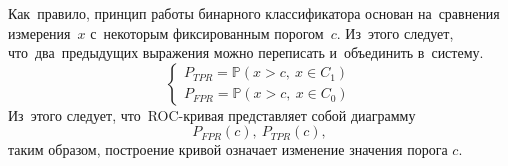 \documentclass[]{scrreprt}
\begin{document}
Как~правило, принцип работы бинарного классификатора основан на~сравнения измерения~$x$ с~некоторым фиксированным порогом~$c$. Из~этого следует, что~два~предыдущих выражения можно переписать и~объединить в~систему.
\begin{equation}\label{eq:TRP+FPR-probability}
\begin{cases}
P_{TPR} = \mathbb{P}(x>c,\ x \in C_{1})\\
P_{FPR} = \mathbb{P}(x>c,\ x \in C_{0})
\end{cases}
\end{equation}
Из~этого следует, что~ROC-кривая представляет собой диаграмму
\begin{equation}\label{eq:ROC-contour}
P_{FPR}(c),\ P_{TPR}(c),
\end{equation}
таким образом, построение кривой означает изменение значения порога $c$.
\end{document}
